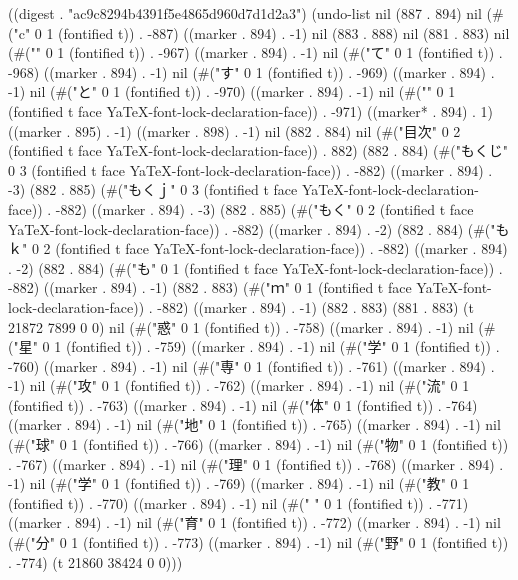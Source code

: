
((digest . "ac9c8294b4391f5e4865d960d7d1d2a3") (undo-list nil (887 . 894) nil (#("c" 0 1 (fontified t)) . -887) ((marker . 894) . -1) nil (883 . 888) nil (881 . 883) nil (#("{" 0 1 (fontified t)) . -967) ((marker . 894) . -1) nil (#("て" 0 1 (fontified t)) . -968) ((marker . 894) . -1) nil (#("す" 0 1 (fontified t)) . -969) ((marker . 894) . -1) nil (#("と" 0 1 (fontified t)) . -970) ((marker . 894) . -1) nil (#("}" 0 1 (fontified t face YaTeX-font-lock-declaration-face)) . -971) ((marker* . 894) . 1) ((marker . 895) . -1) ((marker . 898) . -1) nil (882 . 884) nil (#("目次" 0 2 (fontified t face YaTeX-font-lock-declaration-face)) . 882) (882 . 884) (#("もくじ" 0 3 (fontified t face YaTeX-font-lock-declaration-face)) . -882) ((marker . 894) . -3) (882 . 885) (#("もくｊ" 0 3 (fontified t face YaTeX-font-lock-declaration-face)) . -882) ((marker . 894) . -3) (882 . 885) (#("もく" 0 2 (fontified t face YaTeX-font-lock-declaration-face)) . -882) ((marker . 894) . -2) (882 . 884) (#("もｋ" 0 2 (fontified t face YaTeX-font-lock-declaration-face)) . -882) ((marker . 894) . -2) (882 . 884) (#("も" 0 1 (fontified t face YaTeX-font-lock-declaration-face)) . -882) ((marker . 894) . -1) (882 . 883) (#("ｍ" 0 1 (fontified t face YaTeX-font-lock-declaration-face)) . -882) ((marker . 894) . -1) (882 . 883) (881 . 883) (t 21872 7899 0 0) nil (#("惑" 0 1 (fontified t)) . -758) ((marker . 894) . -1) nil (#("星" 0 1 (fontified t)) . -759) ((marker . 894) . -1) nil (#("学" 0 1 (fontified t)) . -760) ((marker . 894) . -1) nil (#("専" 0 1 (fontified t)) . -761) ((marker . 894) . -1) nil (#("攻" 0 1 (fontified t)) . -762) ((marker . 894) . -1) nil (#("流" 0 1 (fontified t)) . -763) ((marker . 894) . -1) nil (#("体" 0 1 (fontified t)) . -764) ((marker . 894) . -1) nil (#("地" 0 1 (fontified t)) . -765) ((marker . 894) . -1) nil (#("球" 0 1 (fontified t)) . -766) ((marker . 894) . -1) nil (#("物" 0 1 (fontified t)) . -767) ((marker . 894) . -1) nil (#("理" 0 1 (fontified t)) . -768) ((marker . 894) . -1) nil (#("学" 0 1 (fontified t)) . -769) ((marker . 894) . -1) nil (#("教" 0 1 (fontified t)) . -770) ((marker . 894) . -1) nil (#("
" 0 1 (fontified t)) . -771) ((marker . 894) . -1) nil (#("育" 0 1 (fontified t)) . -772) ((marker . 894) . -1) nil (#("分" 0 1 (fontified t)) . -773) ((marker . 894) . -1) nil (#("野" 0 1 (fontified t)) . -774) (t 21860 38424 0 0)))
